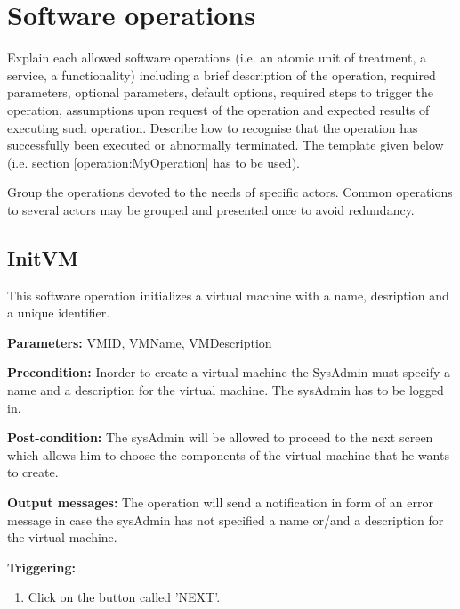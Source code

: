 \chapter{Software operations}
\label{chap:soptware_operations}


Explain each allowed software operations (i.e. an atomic unit of treatment, a service, a functionality) including a brief description of the operation, required parameters, optional parameters, default options, required steps to trigger the operation, assumptions upon request of the operation and expected results of executing such operation.
Describe how to recognise that the operation has successfully been executed or
abnormally terminated. The template given below (i.e. section \ref{operation:MyOperation} has to be used).

Group the operations devoted to the needs of specific actors. Common
operations to several actors may be grouped and presented once to avoid redundancy.


\section{InitVM}
\label{operation:InitVM}
This software operation initializes a virtual machine with a name, desription
and a unique identifier.
\begin{description}

\item \textbf{Parameters:} VMID, VMName, VMDescription
\item \textbf{Precondition:} Inorder to create a virtual machine the SysAdmin must
specify a name and a description for the virtual machine. The sysAdmin has to be
logged in.
\item \textbf{Post-condition:} The sysAdmin will be allowed to proceed to the
next screen which allows him to choose the components of the virtual machine
that he wants to create.
\item \textbf{Output messages:} The operation will send a notification in form
of an error message in case the sysAdmin has not specified a name or/and a
description for the virtual machine.

\item \textbf{Triggering:}
\begin{enumerate}
\item Click on the button called 'NEXT'.
\end{enumerate}

 
\end{description}

